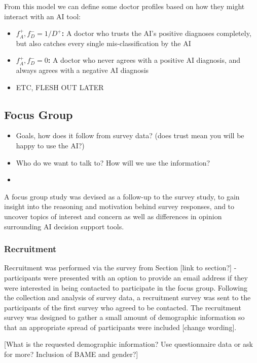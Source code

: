 \documentclass[manuscript,screen,review]{acmart}
\begin{document}
From this model we can define some doctor profiles based on how they might interact with an AI tool:

\begin{itemize}
    \item \textbf{$f^+_A, f^-_D = 1/D^+$:}  A doctor who trusts the AI's positive diagnoses completely, but also catches every single mis-classification by the AI
    \item \textbf{$f^+_A, f^-_D = 0$:}      A doctor who never agrees with a positive AI diagnosis, and always agrees with a negative AI diagnosis
    \item ETC, FLESH OUT LATER
\end{itemize}

\subsection{Focus Group}
\begin{itemize}
    \item Goals, how does it follow from survey data? (does trust mean you will be happy to use the AI?)
    \item Who do we want to talk to? How will we use the information?
    \item 
\end{itemize}

A focus group study was devised as a follow-up to the survey study, to gain insight into the reasoning and motivation behind survey responses, and to uncover topics of interest and concern as well as differences in opinion surrounding AI decision support tools.  



\subsubsection{Recruitment}

Recruitment was performed via the survey from Section [link to section?] - participants were presented with an option to provide an email address if they were interested in being contacted to participate in the focus group. Following the collection and analysis of survey data, a recruitment survey was sent to the participants of the first survey who agreed to be contacted. The recruitment survey was designed to gather a small amount of demographic information so that an appropriate spread of participants were included [change wording].

[What is the requested demographic information? Use questionnaire data or ask for more? Inclusion of BAME and gender?]
\end{document}
